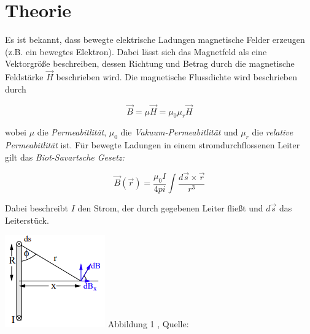 \section{Theorie \cite{sample}}
\label{sec:Theorie}

Es ist bekannt, dass bewegte elektrische Ladungen magnetische Felder erzeugen (z.B. ein bewegtes Elektron).
Dabei lässt sich das Magnetfeld als eine Vektorgröße beschreiben, dessen Richtung und Betrag durch die magnetische Feldstärke $\vec{H}$ beschrieben wird.
Die magnetische Flussdichte wird beschrieben durch

\begin{equation} \label{eq:Flussdichte}
    \vec{B} = \mu \vec{H} = \mu_{0} \mu_{r} \vec{H}
\end{equation}

wobei $\mu$ die \textit{Permeabitlität}, $\mu_{0}$ die \textit{Vakuum-Permeabitlität} und $\mu_{r}$ die \textit{relative Permeabitlität} ist.
Für bewegte Ladungen in einem stromdurchflossenen Leiter gilt das \textit{Biot-Savartsche Gesetz:}

\begin{equation} \label{eq:Biot-Savart-Gesetz}
    \vec{B}(\vec{r}) = \frac{\mu_{0}I}{4pi} \int \frac{d\vec{s} \times \vec{r}}{r^3}
\end{equation}


\begin{minipage}{0.7\textwidth}
    Dabei beschreibt $I$ den Strom, der durch gegebenen Leiter fließt und $d\vec{s}$ das Leiterstück.
\end{minipage}
\begin{minipage}{0.3\textwidth}
    \includegraphics[width=\textwidth]{pictures/BiotSavart1.png}
    \small{Abbildung 1 , Quelle: \cite{sample}}
\end{minipage}

